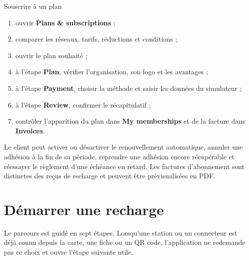 \begin{procedurebox}{Souscrire à un plan}
  \begin{enumerate}[leftmargin=1.6em]
    \item ouvrir \textbf{Plans \& subscriptions} ;
    \item comparer les réseaux, tarifs, réductions et conditions ;
    \item ouvrir le plan souhaité ;
    \item à l'étape \textbf{Plan}, vérifier l'organisation, son logo et les
    avantages ;
    \item à l'étape \textbf{Payment}, choisir la méthode et saisir les données
    du simulateur ;
    \item à l'étape \textbf{Review}, confirmer le récapitulatif ;
    \item contrôler l'apparition du plan dans \textbf{My memberships} et de la
    facture dans \textbf{Invoices}.
  \end{enumerate}
\end{procedurebox}


Le client peut activer ou désactiver le renouvellement automatique, annuler une
adhésion à la fin de sa période, reprendre une adhésion encore récupérable et
réessayer le règlement d'une échéance en retard. Les factures d'abonnement sont
distinctes des reçus de recharge et peuvent être prévisualisées en PDF.

\section{Démarrer une recharge}

Le parcours est guidé en sept étapes. Lorsqu'une station ou un connecteur est
déjà connu depuis la carte, une fiche ou un QR code, l'application ne redemande
pas ce choix et ouvre l'étape suivante utile.

